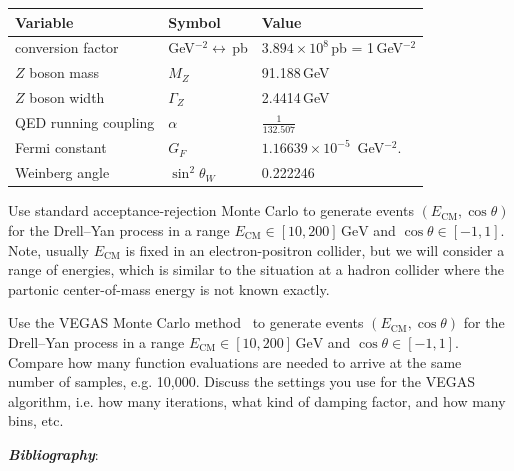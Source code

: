 \begin{center}
  \begin{tabular}{lll}
    Variable             & Symbol                        & Value                                  \\ \hline
    conversion factor    & GeV$^{-2}\leftrightarrow$\,pb & $3.894\times 10^8$\,pb = 1\,GeV$^{-2}$ \\
    $Z$ boson mass       & $M_Z$                         & 91.188\,GeV                            \\
    $Z$ boson width      & $\Gamma_Z$                    & 2.4414\,GeV                            \\
    QED running coupling & $\alpha$                      & $\frac{1}{132.507}$                    \\
    Fermi constant       & $G_F$                         & $1.16639\times 10^{-5}$~GeV$^{-2}$.    \\
    Weinberg angle       & $\sin^2 \theta_W$             & 0.222246                               \\
  \end{tabular}
\end{center}

\begin{problem}
Use standard acceptance-rejection Monte Carlo to generate events $(E_\text{CM}, \cos\theta)$ for the Drell--Yan process in a range $E_\text{CM} \in [10, 200]\,\text{GeV}$ and $\cos\theta \in [-1, 1]$.
Note, usually $E_\text{CM}$ is fixed in an electron-positron collider, but we will consider a range of energies, which is similar to the situation at a hadron collider where the partonic center-of-mass energy is not known exactly.
\end{problem}

\begin{problem}
Use the VEGAS Monte Carlo method~\cite{Lepage:1977sw,Lepage:2020tgj} to generate events $(E_\text{CM}, \cos\theta)$ for the Drell--Yan process in a range $E_\text{CM} \in [10, 200]\,\text{GeV}$ and $\cos\theta \in [-1, 1]$.
Compare how many function evaluations are needed to arrive at the same number of samples, e.g. 10,000.
Discuss the settings you use for the VEGAS algorithm, i.e. how many iterations, what kind of damping factor, and how many bins, etc.
\end{problem}

\newpage

\noindent\textbf{\emph{Bibliography}}:\\
\printbibliography[heading=none]


